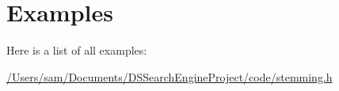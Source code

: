 \section{Examples}
Here is a list of all examples\+:\begin{DoxyCompactItemize}
\item 
\hyperlink{_2_users_2sam_2_documents_2_d_s_search_engine_project_2code_2stemming_8h-example}{/\+Users/sam/\+Documents/\+D\+S\+Search\+Engine\+Project/code/stemming.\+h}
\end{DoxyCompactItemize}
